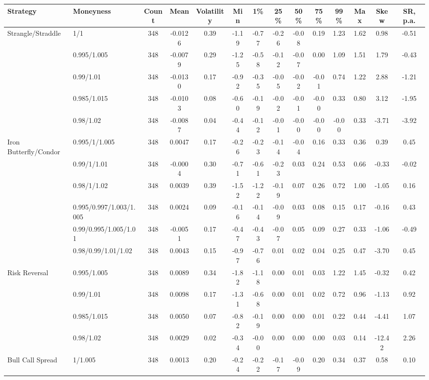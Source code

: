 \begin{tabular}{llcccccccccccc}
\toprule
Strategy & Moneyness & Count & Mean & Volatility & Min & 1\% & 25\% & 50\% & 75\% & 99\% & Max & Skew & SR, p.a. \\
\midrule
Strangle/Straddle & 1/1 & 348 & -0.0126 & 0.39 & -1.19 & -0.77 & -0.26 & -0.08 & 0.19 & 1.23 & 1.62 & 0.98 & -0.51 \\
 & 0.995/1.005 & 348 & -0.0079 & 0.29 & -1.25 & -0.58 & -0.12 & -0.07 & 0.00 & 1.09 & 1.51 & 1.79 & -0.43 \\
 & 0.99/1.01 & 348 & -0.0130 & 0.17 & -0.92 & -0.35 & -0.05 & -0.02 & -0.01 & 0.74 & 1.22 & 2.88 & -1.21 \\
 & 0.985/1.015 & 348 & -0.0103 & 0.08 & -0.60 & -0.19 & -0.02 & -0.01 & -0.00 & 0.33 & 0.80 & 3.12 & -1.95 \\
 & 0.98/1.02 & 348 & -0.0087 & 0.04 & -0.44 & -0.12 & -0.01 & -0.00 & -0.00 & -0.00 & 0.33 & -3.71 & -3.92 \\
Iron Butterfly/Condor & 0.995/1/1.005 & 348 & 0.0047 & 0.17 & -0.26 & -0.23 & -0.14 & -0.04 & 0.16 & 0.33 & 0.36 & 0.39 & 0.45 \\
 & 0.99/1/1.01 & 348 & -0.0004 & 0.30 & -0.71 & -0.61 & -0.23 & 0.03 & 0.24 & 0.53 & 0.66 & -0.33 & -0.02 \\
 & 0.98/1/1.02 & 348 & 0.0039 & 0.39 & -1.52 & -1.22 & -0.19 & 0.07 & 0.26 & 0.72 & 1.00 & -1.05 & 0.16 \\
 & 0.995/0.997/1.003/1.005 & 348 & 0.0024 & 0.09 & -0.16 & -0.14 & -0.09 & 0.03 & 0.08 & 0.15 & 0.17 & -0.16 & 0.43 \\
 & 0.99/0.995/1.005/1.01 & 348 & -0.0051 & 0.17 & -0.47 & -0.43 & -0.07 & 0.05 & 0.09 & 0.27 & 0.33 & -1.06 & -0.49 \\
 & 0.98/0.99/1.01/1.02 & 348 & 0.0043 & 0.15 & -0.97 & -0.76 & 0.01 & 0.02 & 0.04 & 0.25 & 0.47 & -3.70 & 0.45 \\
Risk Reversal & 0.995/1.005 & 348 & 0.0089 & 0.34 & -1.82 & -1.18 & 0.00 & 0.01 & 0.03 & 1.22 & 1.45 & -0.32 & 0.42 \\
 & 0.99/1.01 & 348 & 0.0098 & 0.17 & -1.31 & -0.68 & 0.00 & 0.01 & 0.02 & 0.72 & 0.96 & -1.13 & 0.92 \\
 & 0.985/1.015 & 348 & 0.0050 & 0.07 & -0.82 & -0.19 & 0.00 & 0.00 & 0.01 & 0.22 & 0.44 & -4.41 & 1.07 \\
 & 0.98/1.02 & 348 & 0.0029 & 0.02 & -0.34 & -0.00 & 0.00 & 0.00 & 0.00 & 0.03 & 0.14 & -12.42 & 2.26 \\
Bull Call Spread & 1/1.005 & 348 & 0.0013 & 0.20 & -0.24 & -0.22 & -0.17 & -0.09 & 0.20 & 0.34 & 0.37 & 0.58 & 0.10 \\

\end{tabular}
